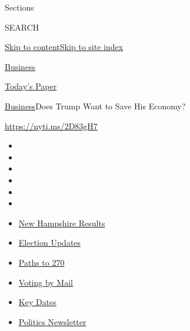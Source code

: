 Sections

SEARCH

\protect\hyperlink{site-content}{Skip to
content}\protect\hyperlink{site-index}{Skip to site index}

\href{https://www.nytimes3xbfgragh.onion/section/business}{Business}

\href{https://myaccount.nytimes3xbfgragh.onion/auth/login?response_type=cookie\&client_id=vi}{}

\href{https://www.nytimes3xbfgragh.onion/section/todayspaper}{Today's
Paper}

\href{/section/business}{Business}\textbar{}Does Trump Want to Save His
Economy?

\url{https://nyti.ms/2D83gH7}

\begin{itemize}
\item
\item
\item
\item
\item
\item
\end{itemize}

\begin{itemize}
\item
  \href{https://www.nytimes3xbfgragh.onion/interactive/2020/09/08/us/elections/results-new-hampshire-primary-elections.html?action=click\&pgtype=Article\&state=default\&region=TOP_BANNER\&context=storylines_menu}{New
  Hampshire Results}
\item
  \href{https://www.nytimes3xbfgragh.onion/live/2020/09/08/us/trump-vs-biden?action=click\&pgtype=Article\&state=default\&region=TOP_BANNER\&context=storylines_menu}{Election
  Updates}
\item
  \href{https://www.nytimes3xbfgragh.onion/interactive/2020/us/elections/election-states-biden-trump.html?action=click\&pgtype=Article\&state=default\&region=TOP_BANNER\&context=storylines_menu}{Paths
  to 270}
\item
  \href{https://www.nytimes3xbfgragh.onion/interactive/2020/08/31/us/politics/vote-by-mail-deadlines.html?action=click\&pgtype=Article\&state=default\&region=TOP_BANNER\&context=storylines_menu}{Voting
  by Mail}
\item
  \href{https://www.nytimes3xbfgragh.onion/interactive/2019/us/elections/2020-presidential-election-calendar.html?action=click\&pgtype=Article\&state=default\&region=TOP_BANNER\&context=storylines_menu}{Key
  Dates}
\item
  \href{https://www.nytimes3xbfgragh.onion/newsletters/politics?action=click\&pgtype=Article\&state=default\&region=TOP_BANNER\&context=storylines_menu}{Politics
  Newsletter}
\end{itemize}

